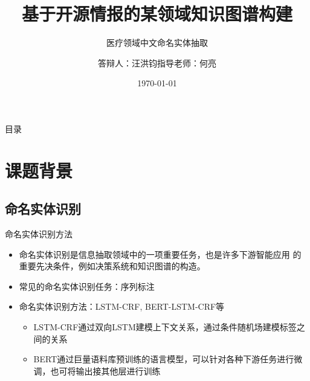 \documentclass[notheorems, aspectratio=54, compress]{beamer}
\title[毕业设计开题报告]{基于开源情报的某领域知识图谱构建}
\subtitle{医疗领域中文命名实体抽取}
\author{答辩人：汪洪钧\quad 指导老师：何亮}
\institute[]{清华大学电子工程系}
\date{\today}
\begin{document}
\begin{frame}
    \titlepage
\end{frame}

\begin{frame}{目录}
  \tableofcontents[sectionstyle=show,subsectionstyle=show,subsubsectionstyle=show/shaded/hide]
\end{frame}

\section{课题背景}


\subsection{命名实体识别}

\begin{frame}{命名实体识别方法}
  \begin{itemize}%
    \item 命名实体识别是信息抽取领域中的一项重要任务，也是许多下游智能应用
    的重要先决条件，例如决策系统和知识图谱的构造。
    \item 常见的命名实体识别任务：序列标注
    \item 命名实体识别方法：LSTM-CRF, BERT-LSTM-CRF等
    \begin{itemize}
      \item LSTM-CRF\cite{lample2016neural}通过双向LSTM建模上下文关系，通过条件随机场建模标签之间的关系
      \item BERT\cite{devlin2018bert}通过巨量语料库预训练的语言模型，可以针对各种下游任务进行微调，也可将输出接其他层进行训练
    \end{itemize}
  \end{itemize}
\end{frame}
\end{document}
